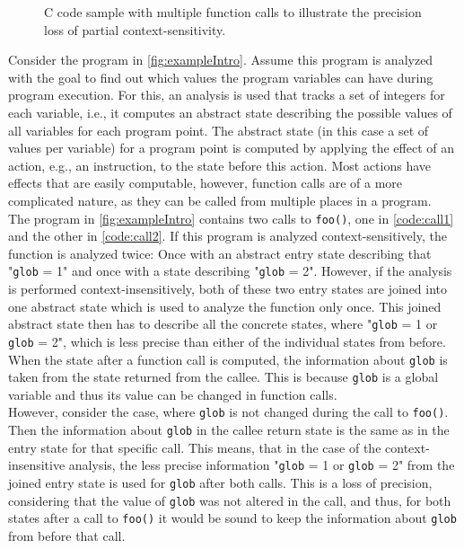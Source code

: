   \begin{figure}[!ht]
    \centering
    \begin{subfigure}{0.35\textwidth}
      \centering
      
    \end{subfigure}
    \caption[C code sample with multiple function calls.]{C code sample with multiple function calls to illustrate the precision loss of partial context-sensitivity.}
    \label{fig:exampleIntro}
  \end{figure}

  \noindent Consider the program in \autoref{fig:exampleIntro}. Assume this program is analyzed with the goal to find out which values the program variables can have during program execution. For this, an analysis is used that tracks a set of integers for each variable, i.e., it computes an abstract state describing the possible values of all variables for each program point. The abstract state (in this case a set of values per variable) for a program point is computed by applying the effect of an action, e.g., an instruction, to the state before this action. Most actions have effects that are easily computable, however, function calls are of a more complicated nature, as they can be called from multiple places in a program.\\
  The program in \autoref{fig:exampleIntro} contains two calls to \texttt{foo()}, one in \autoref{code:call1} and the other in \autoref{code:call2}. If this program is analyzed context-sensitively, the function is analyzed twice: Once with an abstract entry state describing that "\texttt{glob} = 1" and once with a state describing "\texttt{glob} = 2". However, if the analysis is performed context-insensitively, both of these two entry states are joined into one abstract state which is used to analyze the function only once. This joined abstract state then has to describe all the concrete states, where "\texttt{glob} = 1 or \texttt{glob} = 2", which is less precise than either of the individual states from before.\\
  When the state after a function call is computed, the information about \texttt{glob} is taken from the state returned from the callee. This is because \texttt{glob} is a global variable and thus its value can be changed in function calls.\\
  However, consider the case, where \texttt{glob} is not changed during the call to \texttt{foo()}. Then the information about \texttt{glob} in the callee return state is the same as in the entry state for that specific call. This means, that in the case of the context-insensitive analysis, the less precise information "\texttt{glob} = 1 or \texttt{glob} = 2" from the joined entry state is used for \texttt{glob} after both calls. This is a loss of precision, considering that the value of \texttt{glob} was not altered in the call, and thus, for both states after a call to \texttt{foo()} it would be sound to keep the information about \texttt{glob} from before that call.\\
